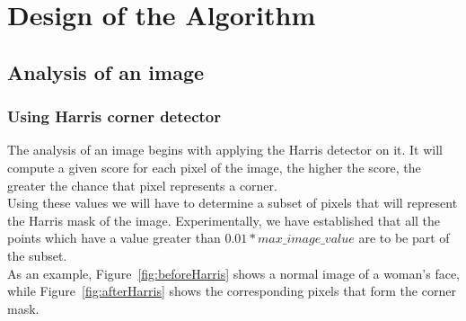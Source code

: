 \chapter{Design of the Algorithm}
\label{chap:design}

\section{Analysis of an image}

\subsection{Using Harris corner detector}
The analysis of an image begins with applying the Harris detector on it. It will compute a given score for each pixel of the image, the higher the score, the greater the chance that pixel represents a corner.\\
Using these values we will have to determine a subset of pixels that will represent the Harris mask of the image.
Experimentally, we have established that all the points which have a value greater than $0.01 * max\_image\_value$ are to be part of the subset.\\
As an example, Figure~\ref{fig:beforeHarris} shows a normal image of a woman's face, while Figure~\ref{fig:afterHarris} shows the corresponding pixels that form the corner mask. \\

